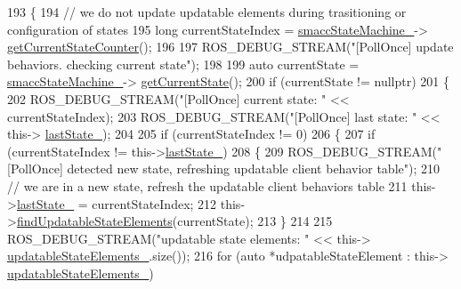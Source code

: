 \begin{DoxyCode}
193             \{
194                 \textcolor{comment}{// we do not update updatable elements during trasitioning or configuration of states}
195                 \textcolor{keywordtype}{long} currentStateIndex = \hyperlink{classsmacc_1_1SignalDetector_a46025de6ac7b5980e22144f9703236a4}{smaccStateMachine\_}->
      \hyperlink{classsmacc_1_1ISmaccStateMachine_aad27c0182b53245d0aded22e63cd83bd}{getCurrentStateCounter}();
196 
197                 ROS\_DEBUG\_STREAM(\textcolor{stringliteral}{"[PollOnce] update behaviors. checking current state"});
198 
199                 \textcolor{keyword}{auto} currentState = \hyperlink{classsmacc_1_1SignalDetector_a46025de6ac7b5980e22144f9703236a4}{smaccStateMachine\_}->
      \hyperlink{classsmacc_1_1ISmaccStateMachine_a610d09dc5341fb63732be713c21fbe86}{getCurrentState}();
200                 \textcolor{keywordflow}{if} (currentState != \textcolor{keyword}{nullptr})
201                 \{
202                     ROS\_DEBUG\_STREAM(\textcolor{stringliteral}{"[PollOnce] current state: "} << currentStateIndex);
203                     ROS\_DEBUG\_STREAM(\textcolor{stringliteral}{"[PollOnce] last state: "} << this->
      \hyperlink{classsmacc_1_1SignalDetector_a72293ed0e98f4200fbe75b53f1e41eab}{lastState\_});
204 
205                     \textcolor{keywordflow}{if} (currentStateIndex != 0)
206                     \{
207                         \textcolor{keywordflow}{if} (currentStateIndex != this->\hyperlink{classsmacc_1_1SignalDetector_a72293ed0e98f4200fbe75b53f1e41eab}{lastState\_})
208                         \{
209                             ROS\_DEBUG\_STREAM(\textcolor{stringliteral}{"[PollOnce] detected new state, refreshing updatable client
       behavior table"});
210                             \textcolor{comment}{// we are in a new state, refresh the updatable client behaviors table}
211                             this->\hyperlink{classsmacc_1_1SignalDetector_a72293ed0e98f4200fbe75b53f1e41eab}{lastState\_} = currentStateIndex;
212                             this->\hyperlink{classsmacc_1_1SignalDetector_a443234ebdf8cedd45cde725e64639dfe}{findUpdatableStateElements}(currentState);
213                         \}
214 
215                         ROS\_DEBUG\_STREAM(\textcolor{stringliteral}{"updatable state elements: "} << this->
      \hyperlink{classsmacc_1_1SignalDetector_a07a5e7bb00c348435d954e22682fa610}{updatableStateElements\_}.size());
216                         \textcolor{keywordflow}{for} (\textcolor{keyword}{auto} *udpatableStateElement : this->
      \hyperlink{classsmacc_1_1SignalDetector_a07a5e7bb00c348435d954e22682fa610}{updatableStateElements\_})

\end{DoxyCode}
